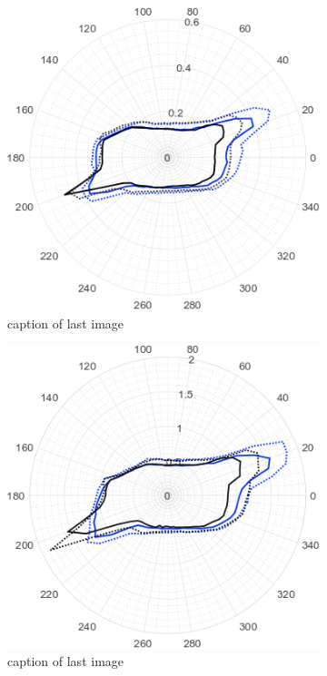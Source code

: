 \begin{figure}
\begin{subfigure}[t]{0.49\textwidth}
    \centering
        \includegraphics[width=0.8\linewidth]{STYLESTUFF/round02Ang.png}
    \caption{caption of last image} 
    \end{subfigure}
    \begin{subfigure}[t]{0.49\textwidth}
     \centering
        \includegraphics[width=0.8\linewidth]{STYLESTUFF/round03Ang.png}
    \caption{caption of last image} 
    \end{subfigure}
    \par\bigskip
    \begin{subfigure}[t]{0.49\textwidth}
     \centering

\end{subfigure}
\end{figure}

